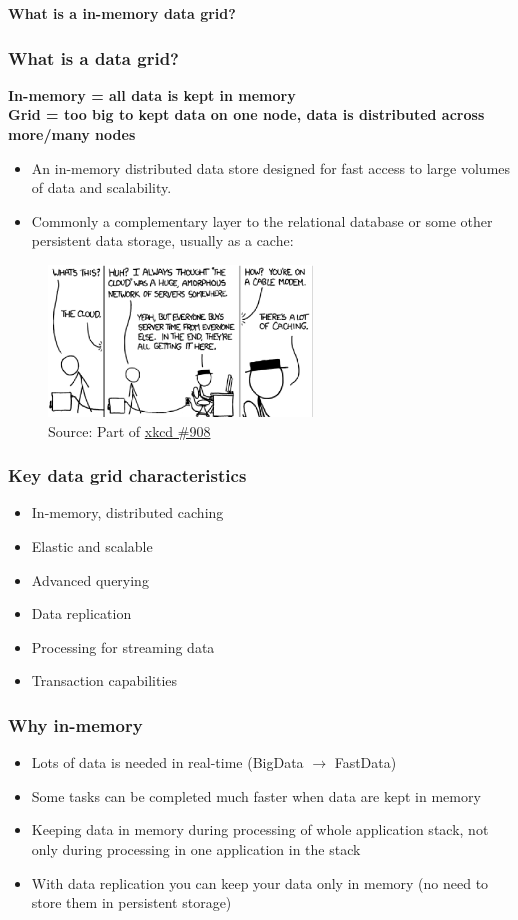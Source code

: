 \documentclass[10pt,utf8]{beamer}
\begin{document}
\begin{frame}
	\centering
	\huge{\textbf{What is a in-memory data grid?}}
\end{frame}

\begin{frame}
	\frametitle{What is a data grid?}
	\centering
	\color{blue}\textbf{
		In-memory = all data is kept in memory \\
		Grid = too big to kept data on one node, data is distributed across more/many nodes
	}\color{black}
	\visible<2> {
	\begin{itemize}
	 \item An in-memory distributed data store designed for fast access to large volumes of data and scalability.
	 \item Commonly a complementary layer to the relational database or some other persistent data storage, usually as a cache:
	\end{itemize}
  }
	\centering
	 {
	\begin{figure}
		\centering
		\includegraphics[width=7cm]{./img/xkcd_908.eps}
		\caption{\tiny{Source: Part of \href{http://xkcd.com/908/}{xkcd \#908}}}
	\end{figure}
	}
\end{frame}

\begin{frame}
	\frametitle{Key data grid characteristics}
	\begin{itemize}
	 \item In-memory, distributed caching
	 \item Elastic and scalable
	 \item Advanced querying
	 \item Data replication
	 \item Processing for streaming data
	 \item Transaction capabilities
	\end{itemize}
\end{frame}

\begin{frame}
	\frametitle{Why in-memory}
	\begin{itemize}
	 \item Lots of data is needed in real-time (BigData $\rightarrow$ FastData)
	 \pause
	 \item Some tasks can be completed much faster when data are kept in memory
	 \pause
	 \item Keeping data in memory during processing of whole application stack, not only during processing in one application in the stack
	 \pause
	 \item With data replication you can keep your data only in memory (no need to store them in persistent storage)
	\end{itemize}
\end{frame}
\end{document}
